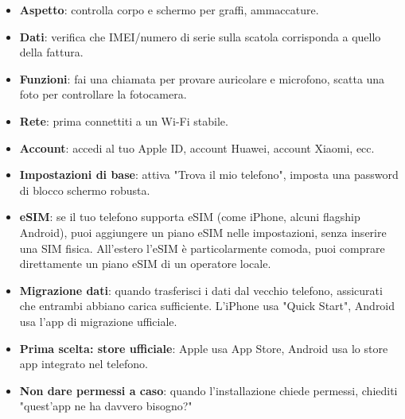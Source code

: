 

\begin{itemize}
  \item \textbf{Aspetto}: controlla corpo e schermo per graffi, ammaccature.
  \item \textbf{Dati}: verifica che IMEI/numero di serie sulla scatola corrisponda a quello della fattura.
  \item \textbf{Funzioni}: fai una chiamata per provare auricolare e microfono, scatta una foto per controllare la fotocamera.
\end{itemize}


\begin{itemize}
  \item \textbf{Rete}: prima connettiti a un Wi-Fi stabile.
  \item \textbf{Account}: accedi al tuo Apple ID, account Huawei, account Xiaomi, ecc.
  \item \textbf{Impostazioni di base}: attiva "Trova il mio telefono", imposta una password di blocco schermo robusta.
  \item \textbf{eSIM}: se il tuo telefono supporta eSIM (come iPhone, alcuni flagship Android), puoi aggiungere un piano eSIM nelle impostazioni, senza inserire una SIM fisica. All'estero l'eSIM è particolarmente comoda, puoi comprare direttamente un piano eSIM di un operatore locale.
  \item \textbf{Migrazione dati}: quando trasferisci i dati dal vecchio telefono, assicurati che entrambi abbiano carica sufficiente. L'iPhone usa "Quick Start", Android usa l'app di migrazione ufficiale.
\end{itemize}


\begin{itemize}
  \item \textbf{Prima scelta: store ufficiale}: Apple usa App Store, Android usa lo store app integrato nel telefono.
  \item \textbf{Non dare permessi a caso}: quando l'installazione chiede permessi, chiediti "quest'app ne ha davvero bisogno?"
\end{itemize}
